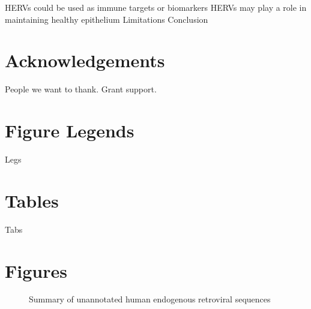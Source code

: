 \documentclass[11pt,letterpaper]{article}
\begin{document}
HERVs could be used as immune targets or biomarkers
HERVs may play a role in maintaining healthy epithelium
Limitations
Conclusion

\section*{Acknowledgements}

People we want to thank. Grant support.




\section*{Figure Legends}

Legs

\section*{Tables}

Tabs

\section*{Figures}

\begin{figure}[ht]
  \caption{Summary of unannotated human endogenous retroviral sequences}
  \label{fig:ele_sum}
\end{figure}
\end{document}
